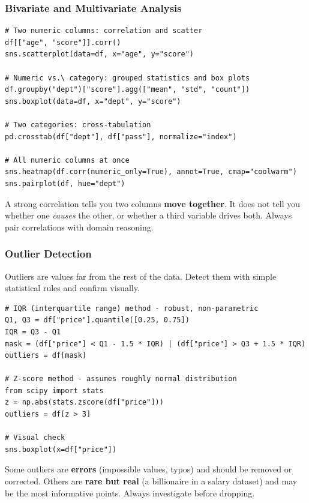 \documentclass[aspectratio=169,10pt]{beamer}
\newcommand{\keyword}[1]{\textcolor{PrimaryBlue}{\textbf{#1}}}
\newenvironment{bluebox}[1]{%
  \vspace{0.08cm}\begin{tcolorbox}[lecturebox,title={#1},fontupper=\small]%
}{\end{tcolorbox}\vspace{0.05cm}}
\begin{document}
\begin{frame}[fragile]
\frametitle{Bivariate and Multivariate Analysis}
\small
\begin{lstlisting}[style=pycode]
# Two numeric columns: correlation and scatter
df[["age", "score"]].corr()
sns.scatterplot(data=df, x="age", y="score")

# Numeric vs.\ category: grouped statistics and box plots
df.groupby("dept")["score"].agg(["mean", "std", "count"])
sns.boxplot(data=df, x="dept", y="score")

# Two categories: cross-tabulation
pd.crosstab(df["dept"], df["pass"], normalize="index")

# All numeric columns at once
sns.heatmap(df.corr(numeric_only=True), annot=True, cmap="coolwarm")
sns.pairplot(df, hue="dept")
\end{lstlisting}

\begin{bluebox}{Correlation is not causation}
A strong correlation tells you two columns \keyword{move together}. It does not tell you whether one \emph{causes} the other, or whether a third variable drives both. Always pair correlations with domain reasoning.
\end{bluebox}
\end{frame}


\begin{frame}[fragile]
\frametitle{Outlier Detection}
\small
Outliers are values far from the rest of the data. Detect them with simple statistical rules and confirm visually.

\vspace{0.12cm}
\begin{lstlisting}[style=pycode]
# IQR (interquartile range) method - robust, non-parametric
Q1, Q3 = df["price"].quantile([0.25, 0.75])
IQR = Q3 - Q1
mask = (df["price"] < Q1 - 1.5 * IQR) | (df["price"] > Q3 + 1.5 * IQR)
outliers = df[mask]

# Z-score method - assumes roughly normal distribution
from scipy import stats
z = np.abs(stats.zscore(df["price"]))
outliers = df[z > 3]

# Visual check
sns.boxplot(x=df["price"])
\end{lstlisting}

\begin{tcolorbox}[lecturebox,title=Decide before you delete]
Some outliers are \keyword{errors} (impossible values, typos) and should be removed or corrected. Others are \keyword{rare but real} (a billionaire in a salary dataset) and may be the most informative points. Always investigate before dropping.
\end{tcolorbox}
\end{frame}
\end{document}
